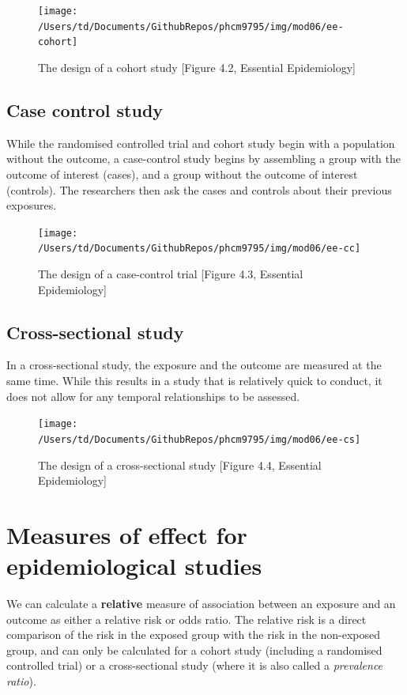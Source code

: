 \documentclass[
]{memoir}
\begin{document}
\begin{figure}[H]
\texttt{[image: /Users/td/Documents/GithubRepos/phcm9795/img/mod06/ee-cohort]} \caption{The design of a cohort study [Figure 4.2, Essential Epidemiology]}\label{fig:ee-fig-cohort}
\end{figure}

\hypertarget{case-control-study}{%
\subsection{Case control study}\label{case-control-study}}

While the randomised controlled trial and cohort study begin with a population without the outcome, a case-control study begins by assembling a group with the outcome of interest (cases), and a group without the outcome of interest (controls). The researchers then ask the cases and controls about their previous exposures.

\begin{figure}[H]
\texttt{[image: /Users/td/Documents/GithubRepos/phcm9795/img/mod06/ee-cc]} \caption{The design of a case-control trial [Figure 4.3, Essential Epidemiology]}\label{fig:ee-fig-cc}
\end{figure}

\hypertarget{cross-sectional-study}{%
\subsection{Cross-sectional study}\label{cross-sectional-study}}

In a cross-sectional study, the exposure and the outcome are measured at the same time. While this results in a study that is relatively quick to conduct, it does not allow for any temporal relationships to be assessed.

\begin{figure}[H]
\texttt{[image: /Users/td/Documents/GithubRepos/phcm9795/img/mod06/ee-cs]} \caption{The design of a cross-sectional study [Figure 4.4, Essential Epidemiology]}\label{fig:ee-fig-cs}
\end{figure}

\hypertarget{measures-of-effect-for-epidemiological-studies}{%
\section{Measures of effect for epidemiological studies}\label{measures-of-effect-for-epidemiological-studies}}

We can calculate a \textbf{relative} measure of association between an exposure and an outcome as either a relative risk or odds ratio. The relative risk is a direct comparison of the risk in the exposed group with the risk in the non-exposed group, and can only be calculated for a cohort study (including a randomised controlled trial) or a cross-sectional study (where it is also called a \emph{prevalence ratio}).
\end{document}
